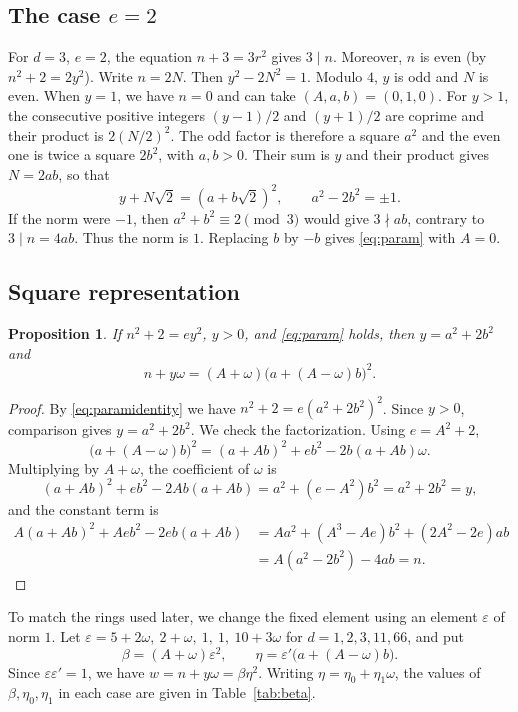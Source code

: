 \documentclass[a4paper,11pt]{article}
\theoremstyle{plain}
\newtheorem{proposition}[theorem]{Proposition}
\theoremstyle{definition}
\theoremstyle{remark}
\numberwithin{equation}{section}
\numberwithin{table}{section}
\newcommand{\tsec}[2]{\texorpdfstring{#1}{#2}}
\begin{document}
\subsection{The case \tsec{$e=2$}{e=2}}

For $d=3$, $e=2$, the equation $n+3=3r^2$ gives $3\mid n$. Moreover, $n$ is even (by $n^2+2=2y^2$).
Write $n=2N$. Then $y^2-2N^2=1$.
Modulo $4$, $y$ is odd and $N$ is even. When $y=1$, we have $n=0$ and can take $(A,a,b)=(0,1,0)$.
For $y>1$, the consecutive positive integers $(y-1)/2$ and $(y+1)/2$ are coprime and their product is $2(N/2)^2$.
The odd factor is therefore a square $a^2$ and the even one is twice a square $2b^2$, with $a,b>0$. Their sum is $y$ and their product gives $N=2ab$, so that
\[
y+N\sqrt2=(a+b\sqrt2)^2,\qquad a^2-2b^2=\pm1.
\]
If the norm were $-1$, then $a^2+b^2\equiv2\pmod3$ would give $3\nmid ab$, contrary to $3\mid n=4ab$.
Thus the norm is $1$. Replacing $b$ by $-b$ gives \eqref{eq:param} with $A=0$.

\subsection{Square representation}

\begin{proposition}\label{prop:square}
If $n^2+2=ey^2$, $y>0$, and \eqref{eq:param} holds, then $y=a^2+2b^2$ and
\[
n+y\omega=(A+\omega)\bigl(a+(A-\omega)b\bigr)^2.
\]
\end{proposition}

\begin{proof}
By \eqref{eq:paramidentity} we have $n^2+2=e(a^2+2b^2)^2$. Since $y>0$, comparison gives $y=a^2+2b^2$.
We check the factorization. Using $e=A^2+2$,
\[
\bigl(a+(A-\omega)b\bigr)^2=(a+Ab)^2+eb^2-2b(a+Ab)\omega.
\]
Multiplying by $A+\omega$, the coefficient of $\omega$ is
\[
(a+Ab)^2+eb^2-2Ab(a+Ab)=a^2+(e-A^2)b^2=a^2+2b^2=y,
\]
and the constant term is
\[
\begin{aligned}
A(a+Ab)^2+Aeb^2-2eb(a+Ab)&=Aa^2+(A^3-Ae)b^2+(2A^2-2e)ab\\
&=A(a^2-2b^2)-4ab=n.
\end{aligned}
\]
\end{proof}

To match the rings used later, we change the fixed element using an element $\varepsilon$ of norm $1$.
Let $\varepsilon=5+2\omega,\ 2+\omega,\ 1,\ 1,\ 10+3\omega$ for $d=1,2,3,11,66$, and put
\[
\beta=(A+\omega)\varepsilon^2,\qquad\eta=\varepsilon'\bigl(a+(A-\omega)b\bigr).
\]
Since $\varepsilon\varepsilon'=1$, we have $w=n+y\omega=\beta\eta^2$.
Writing $\eta=\eta_0+\eta_1\omega$, the values of $\beta,\eta_0,\eta_1$ in each case are given in Table~\ref{tab:beta}.
\end{document}
